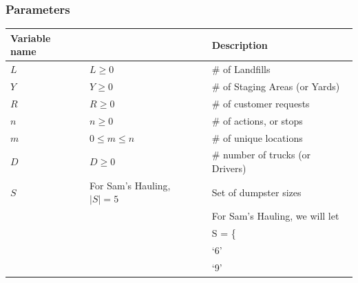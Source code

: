 \documentclass{article}
\begin{document}
\subsubsection{Parameters}
\begin{tabular}{ l | l | l }
 Variable name                 &                                                                & Description                                                   \\
\hline
  $L$                          & $  L \ge 0                                                  $  & \# of Landfills                                               \\
  $Y$                          & $  Y \ge 0                                                  $  & \# of Staging Areas (or Yards)                                \\
  $R$                          & $  R \ge 0                                                  $  & \# of customer requests                                       \\
  $n$                          & $  n \ge 0                                                  $  & \# of actions, or stops                                       \\
  $m$                          &   $0 \le m \le n$                                              & \# of unique locations                                        \\
  $D$                          & $  D \ge 0                                                  $  & \# number of trucks (or Drivers)                              \\
  $S$                          &   For Sam's Hauling, $ |S| = 5$                                & Set of dumpster sizes                                         \\
                               & $                                                           $  & For Sam's Hauling, we will let                                \\
                               & $                                                           $  & S = \{                                                        \\
                               & $                                                           $  &   `6'                                                         \\
                               & $                                                           $  &   `9'                                                         \\

\end{tabular}
\end{document}
